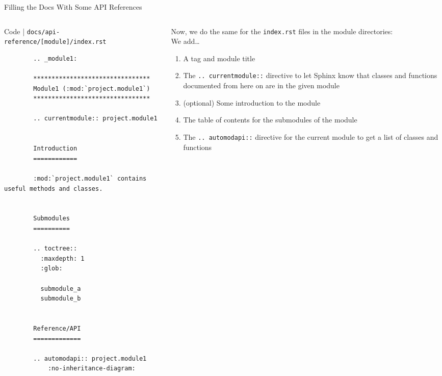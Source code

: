 \begin{frame}[fragile]{Filling the Docs With Some API References}

  \begin{columns}[onlytextwidth]
    \begin{column}{0.52\textwidth}
      \begin{block}{Code | \texttt{docs/api-reference/[module]/index.rst}}
      \scriptsize
      \begin{verbatim}
        .. _module1:

        ********************************
        Module1 (:mod:`project.module1`)
        ********************************

        .. currentmodule:: project.module1


        Introduction
        ============

        :mod:`project.module1` contains useful methods and classes.


        Submodules
        ==========

        .. toctree::
          :maxdepth: 1
          :glob:

          submodule_a
          submodule_b


        Reference/API
        =============

        .. automodapi:: project.module1
            :no-inheritance-diagram:
      \end{verbatim}
      \end{block}
    \end{column}
    \hfill
    \begin{column}{0.46\textwidth}
      Now, we do the same for the \texttt{index.rst} files in the module directories:\\[1em]
      We add\dots
      \begin{enumerate}
        \setlength{\itemsep}{1.5em}
        \item A tag and module title
        \item The \texttt{.. currentmodule::} directive to let Sphinx know that
          classes and functions documented from here on are in the given module
        \item (optional) Some introduction to the module
        \item The table of contents for the submodules of the module
        \item The \texttt{.. automodapi::} directive for the current module to get a list of
          classes and functions
      \end{enumerate}
    \end{column}
  \end{columns}
\end{frame}

